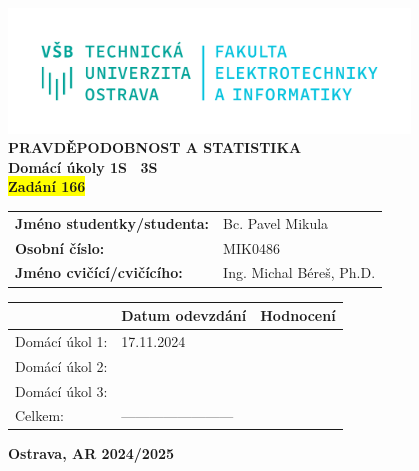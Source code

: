 \documentclass[a4paper,12pt]{report}
\newcommand{\sourceId}   {166}
\newcommand{\studentName}{Bc. Pavel Mikula}
\newcommand{\studentID}  {MIK0486}
\newcommand{\teacherName}{Ing. Michal Béreš, Ph.D.}
\begin{document}
\thispagestyle{empty}
\setcounter{page}{0}

\begin{center}
    \includegraphics[width=0.8\textwidth]{assets/logo.png} \\[4em]
    \vspace{4em}
    \textbf{PRAVDĚPODOBNOST A STATISTIKA} \\
    \vspace{1em}
    \textbf{Domácí úkoly 1S \textendash\ 3S} \\
    \textbf{\colorbox{yellow}{Zadání \sourceId}} \\
\end{center}

\vspace{2em}
\hspace{3em}
\begin{tabular}{ll}
    \textbf{Jméno studentky/studenta:}  & \hspace{6em} \studentName \\[0.5em]
    \textbf{Osobní číslo:}              & \hspace{6em} \studentID   \\[0.5em]
    \textbf{Jméno cvičící/cvičícího:}   & \hspace{6em} \teacherName \\
\end{tabular}

\vspace{10em}
\begin{center}
    \renewcommand{\arraystretch}{1.3}
    \begin{tabular}{|p{8em}|P{10em}|P{10em}|}
        \hline
                        & \textbf{Datum odevzdání}  & \textbf{Hodnocení}    \\ \hline
        Domácí úkol 1:  & 17.11.2024                &                       \\ \hline
        Domácí úkol 2:  &                           &                       \\ \hline
        Domácí úkol 3:  &                           &                       \\ \hline
        Celkem:         & ------------------------  &                       \\ \hline
    \end{tabular}
\end{center}

\vspace{5em}
\begin{center}
    \textbf{Ostrava, AR 2024/2025}
\end{center}

%

\newpage


%

%

%
\end{document}
